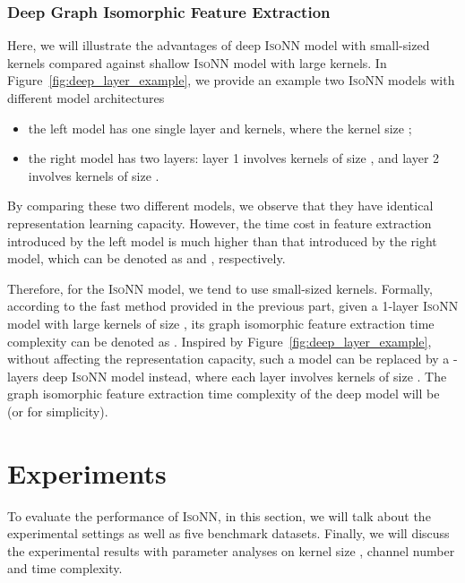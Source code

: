 \documentclass{article} \usepackage{iclr2020_conference,times}
\newcommand{\our}{\textsc{IsoNN}}
\begin{document}
\subsubsection{Deep Graph Isomorphic Feature Extraction}
\vspace*{-5pt}
Here, we will illustrate the advantages of deep {\our} model with small-sized kernels compared against shallow {\our} model with large kernels. In Figure~\ref{fig:deep_layer_example}, we provide an example two {\our} models with different model architectures
\begin{itemize}
\item the left model has one single layer and  kernels, where the kernel size ;
\item the right model has two layers: layer 1 involves  kernels of size , and layer 2 involves  kernels of size .
\end{itemize}
By comparing these two different models, we observe that they have identical representation learning capacity. However, the time cost in feature extraction introduced by the left model is much higher than that introduced by the right model, which can be denoted as  and , respectively. 

Therefore, for the {\our} model, we tend to use small-sized kernels. Formally, according to the fast method provided in the previous part, given a 1-layer {\our} model with  large kernels of size , its graph isomorphic feature extraction time complexity can be denoted as . Inspired by Figure~\ref{fig:deep_layer_example}, without affecting the representation capacity, such a model can be replaced by a -layers deep {\our} model instead, where each layer involves  kernels of size . The graph isomorphic feature extraction time complexity of the deep model will be  (or  for simplicity).



 \vspace*{-10pt}
\section{Experiments}\label{sec:experiment}
\vspace*{-8pt}
To evaluate the performance of {\our}, in this section, we will talk about the experimental settings as well as five benchmark datasets. Finally, we will discuss the experimental results with parameter analyses on kernel size , channel number and time complexity.
\end{document}
